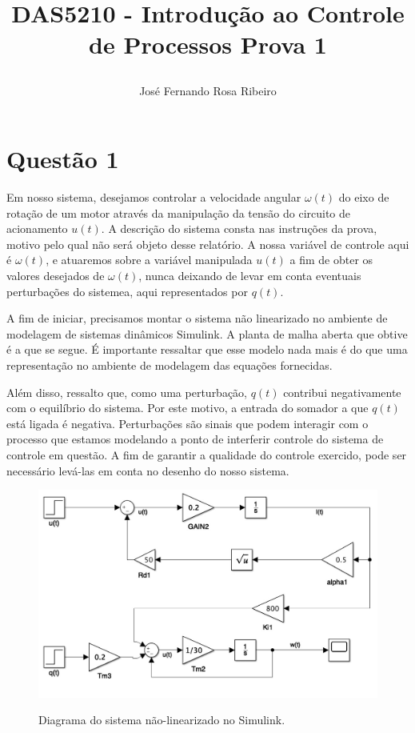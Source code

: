 \documentclass[11pt]{article}
\begin{document}
\author{
	José Fernando Rosa Ribeiro
}
\title{DAS5210 - Introdução ao Controle de Processos
	\newline
	\newline
	\large Prova 1
	\date{\vspace{-5ex}}}
\maketitle
\setcounter{secnumdepth}{0}

\section{Questão 1}

Em nosso sistema, desejamos controlar a velocidade angular $\omega(t)$ do eixo de rotação de um motor através da manipulação
da tensão do circuito de acionamento $u(t)$. A descrição do sistema consta nas instruções da prova,
motivo pelo qual não será objeto desse relatório. A nossa variável de controle aqui é $\omega(t)$, e atuaremos
sobre a variável manipulada $u(t)$ a fim de obter os valores desejados de $\omega(t)$, nunca deixando de levar
em conta eventuais perturbações do sistemea, aqui representados por $q(t)$.

A fim de iniciar, precisamos montar o sistema não linearizado no ambiente de modelagem de sistemas dinâmicos Simulink.
A planta de malha aberta que obtive é a que se segue.
É importante ressaltar que esse modelo nada mais é do que uma representação no ambiente de modelagem das equações fornecidas.

Além disso, ressalto que, como uma perturbação, $q(t)$ contribui negativamente com o equilíbrio do sistema.
Por este motivo, a entrada do somador a que $q(t)$ está ligada é negativa.
Perturbações são sinais que podem interagir com o processo que estamos modelando a ponto de interferir controle
do sistema de controle em questão.
A fim de garantir a qualidade do controle exercido, pode ser necessário levá-las em conta no desenho do nosso sistema.

\begin{figure}[H]
	\centering
	{\includegraphics[width=\textwidth]
		{assets/q1_non_linearized_schema.jpg}}
	\caption{Diagrama do sistema não-linearizado no Simulink.}
\end{figure}
\end{document}
